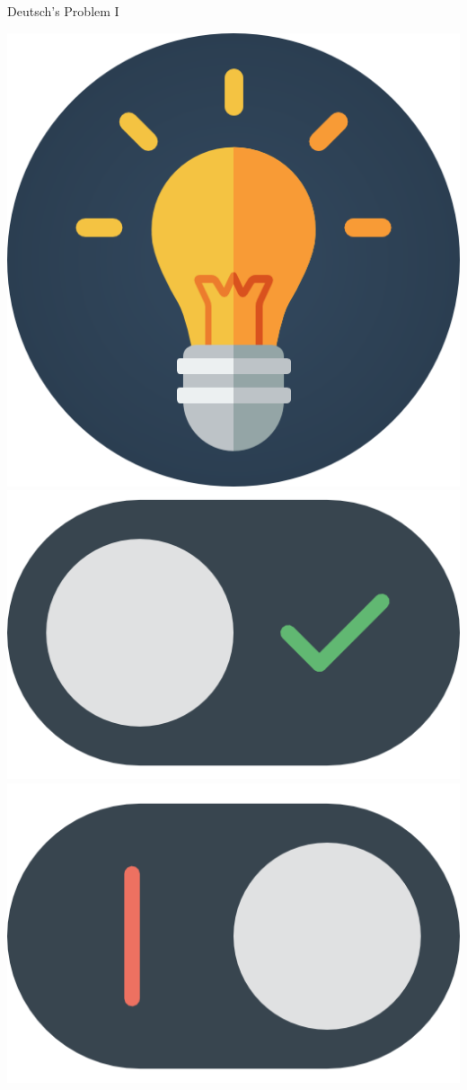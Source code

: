 \documentclass[9pt, handout, aspectratio=169]{beamer}		%
\begin{document}
\begin{frame}{Deutsch’s Problem I}
\begin{multicols}{2}
		\columnbreak
		\begin{center}
			\includegraphics[width=.20\paperwidth]{Figures/Light_Bulb} \\
			\includegraphics[width=.08\paperwidth]{Figures/Switch_ON} \\
			\includegraphics[width=.08\paperwidth]{Figures/Switch_OFF}

\end{center}
\end{multicols}
\end{frame}
\end{document}
